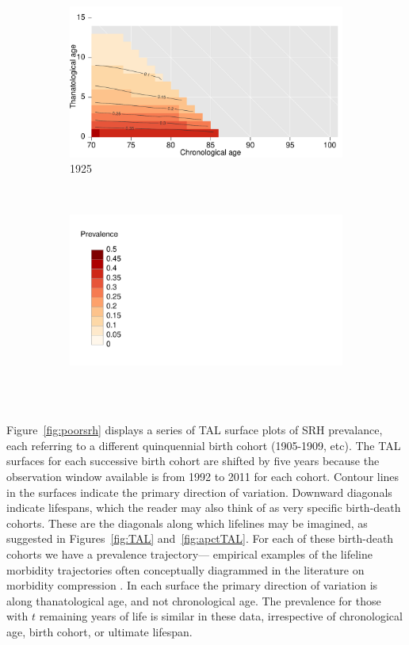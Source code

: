 \documentclass[12pt,oneside,a4paper]{article} %
\begin{document}
\begin{figure}[h!]
\begin{subfigure}{.46\textwidth}
\centering
\caption{1925}
\vspace{-1em}
\label{fig:srh1925}
\includegraphics[scale=0.32]{Figures/TALapplication/srhpoor1925.pdf}
\end{subfigure}
~
\begin{subfigure}{.46\textwidth}
\centering
\caption*{~}
\vspace{-1em}
\label{fig:srhlegend}
\includegraphics[scale=0.32]{Figures/TALapplication/Legend.pdf}
\end{subfigure}
\end{figure} 

Figure~\ref{fig:poorsrh} displays a series of TAL surface plots of SRH
prevalance, each referring to a different quinquennial birth cohort (1905-1909,
etc). The TAL surfaces for
each successive birth cohort are shifted by five years because the observation
window available is from 1992 to 2011 for each cohort. Contour lines in the
surfaces indicate the primary direction of variation. Downward
diagonals indicate lifespans, which the reader may also think of as very
specific birth-death cohorts. These are the diagonals along which lifelines may
be imagined, as suggested in Figures~\ref{fig:TAL} and~\ref{fig:apctTAL}. For each
of these birth-death cohorts we have a prevalence trajectory--- empirical examples of the lifeline morbidity trajectories often conceptually diagrammed in the literature on morbidity compression
\citep[e.g.,][]{fries2005frailty}.
In each surface the primary direction of variation is along thanatological age,
and not chronological age. The prevalence for those with $t$ remaining years of
life is similar in these data, irrespective of chronological age, birth cohort,
or ultimate lifespan.
\end{document}
